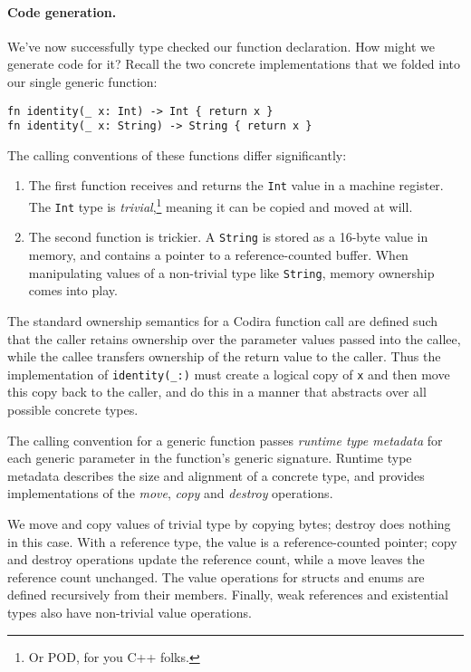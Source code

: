 \documentclass[../generics]{subfiles}
\begin{document}
\paragraph{Code generation.}
We've now successfully type checked our function declaration. How might we generate code for it? Recall the two concrete implementations that we folded into our single generic function:
\begin{Verbatim}
fn identity(_ x: Int) -> Int { return x }
fn identity(_ x: String) -> String { return x }
\end{Verbatim}
The calling conventions of these functions differ significantly:
\begin{enumerate}
\item The first function receives and returns the \texttt{Int} value in a machine register. The \texttt{Int} type is \emph{trivial},\footnote{Or POD, for you C++ folks.} meaning it can be copied and moved at will.
\item The second function is trickier. A \texttt{String} is stored as a 16-byte value in memory, and contains a pointer to a reference-counted buffer. When manipulating values of a non-trivial type like \texttt{String}, memory ownership comes into play.
\end{enumerate}

The standard ownership semantics for a Codira function call are defined such that the caller retains ownership over the parameter values passed into the callee, while the callee transfers ownership of the return value to the caller. Thus the implementation of \verb|identity(_:)| must create a logical copy of \texttt{x} and then move this copy back to the caller, and do this in a manner that abstracts over all possible concrete types.

The calling convention for a generic function passes \emph{runtime type metadata} for each generic parameter in the function's generic signature. Runtime type metadata describes the size and alignment of a concrete type, and provides implementations of the \emph{move}, \emph{copy} and \emph{destroy} operations.

We move and copy values of trivial type by copying bytes; destroy does nothing in this case. With a reference type, the value is a reference-counted pointer; copy and destroy operations update the reference count, while a move leaves the reference count unchanged. The value operations for structs and enums are defined recursively from their members. Finally, weak references and existential types also have non-trivial value operations.
\end{document}
